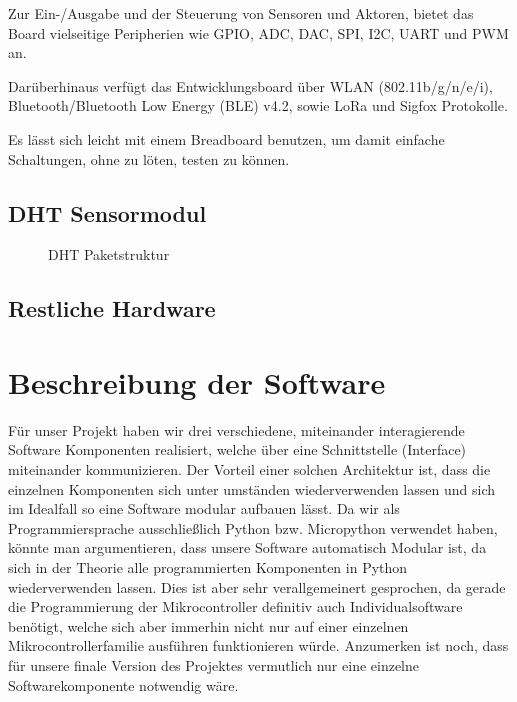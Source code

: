 Zur Ein-/Ausgabe und der Steuerung von Sensoren und Aktoren, bietet das Board vielseitige Peripherien wie GPIO, ADC, DAC, SPI, I2C, UART und PWM an. 

Darüberhinaus verfügt das Entwicklungsboard über WLAN (802.11b/g/n/e/i), Bluetooth/Bluetooth Low Energy (BLE) v4.2, sowie LoRa und Sigfox Protokolle.  

Es lässt sich leicht mit einem Breadboard benutzen, um damit einfache Schaltungen, ohne zu löten, testen zu können. 

\subsection{DHT Sensormodul} \label{DHT}

\begin{center}
	\begin{figure}[h]
	 
	 \noindent{}
	 \caption[DHT Paketstruktur]{DHT Paketstruktur}
	 \label{fig:zeitplanung}
	\end{figure}
\end{center}



\subsection{Restliche Hardware} \label{Restliche Hardware}




\section{Beschreibung der Software} \label{Software}

Für unser Projekt haben wir drei verschiedene, miteinander interagierende Software Komponenten realisiert, welche über eine Schnittstelle (Interface) miteinander kommunizieren. 
Der Vorteil einer solchen Architektur ist, dass die einzelnen Komponenten sich unter umständen wiederverwenden lassen und sich im Idealfall so eine Software modular aufbauen lässt.
Da wir als Programmiersprache ausschließlich Python bzw. Micropython verwendet haben, könnte man argumentieren, dass unsere Software automatisch Modular ist, da sich in der Theorie alle programmierten Komponenten in Python wiederverwenden lassen.
Dies ist aber sehr verallgemeinert gesprochen, da gerade die Programmierung der Mikrocontroller definitiv auch Individualsoftware benötigt, welche sich aber immerhin nicht nur auf einer einzelnen Mikrocontrollerfamilie ausführen funktionieren würde.
Anzumerken ist noch, dass für unsere finale Version des Projektes vermutlich nur eine einzelne Softwarekomponente notwendig wäre.


